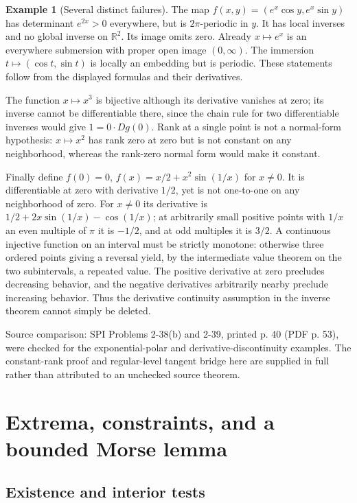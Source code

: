 \documentclass[11pt,oneside,openany]{book}
\theoremstyle{definition}
\newtheorem{example}[theorem]{Example}
\theoremstyle{remark}
\newcommand{\R}{\mathbb R}
\newcommand{\family}[1]{}
\newcommand{\source}[1]{\par\begingroup\small\sffamily\color{black!65}Source comparison: #1\par\endgroup}
\begin{document}
\begin{example}[Several distinct failures]\label{d04:04:counterexamples}
The map $f(x,y)=(e^x\cos y,e^x\sin y)$ has determinant $e^{2x}>0$
everywhere, but is $2\pi$-periodic in $y$. It has local inverses and no
global inverse on $\R^2$. Its image omits zero. Already $x\mapsto e^x$
is an everywhere submersion with proper open image $(0,\infty)$.
The immersion $t\mapsto(\cos t,\sin t)$ is locally an embedding but is
periodic. These statements follow from the displayed formulas and their
derivatives.

The function $x\mapsto x^3$ is bijective although its derivative vanishes
at zero; its inverse cannot be differentiable there, since the chain rule
for two differentiable inverses would give $1=0\cdot Dg(0)$. Rank at a
single point is not a normal-form hypothesis: $x\mapsto x^2$ has rank
zero at zero but is not constant on any neighborhood, whereas the rank-zero
normal form would make it constant.

Finally define $f(0)=0$, $f(x)=x/2+x^2\sin(1/x)$ for $x\ne0$.
It is differentiable at zero with derivative $1/2$, yet is not one-to-one
on any neighborhood of zero. For $x\ne0$ its derivative is
$1/2+2x\sin(1/x)-\cos(1/x)$; at arbitrarily small positive points with
$1/x$ an even multiple of $\pi$ it is $-1/2$, and at odd multiples it
is $3/2$. A continuous injective function on an interval must be strictly
monotone: otherwise three ordered points giving a reversal yield, by the
intermediate value theorem on the two subintervals, a repeated value.
The positive derivative at zero precludes decreasing behavior, and the
negative derivatives arbitrarily nearby preclude increasing behavior.
Thus the derivative continuity assumption in the inverse theorem cannot
simply be deleted.
\end{example}
\source{SPI Problems 2-38(b) and 2-39, printed p. 40 (PDF p. 53), were
checked for the exponential-polar and derivative-discontinuity examples.
The constant-rank proof and regular-level tangent bridge here are supplied
in full rather than attributed to an unchecked source theorem.}



\chapter{Extrema, constraints, and a bounded Morse lemma}
\label{ch:d04-05}

\section{Existence and interior tests}
\family{K04.05.01}\family{K04.05.02}\family{K04.05.03}
\family{K04.05.04}\family{K04.05.05}\family{K04.05.06}
\end{document}
